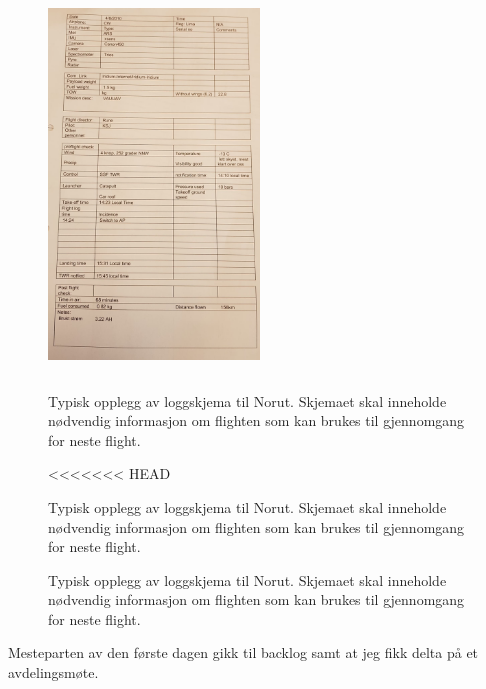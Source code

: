 \documentclass[12pt, a4paper]{article}
\begin{document}
\begin{figure}[ht]
	\centering
	\includegraphics[height= 10cm, width=0.5\textwidth]{bilder/flightlogNorut.png}

		\caption[Loggskjema]{Typisk opplegg av loggskjema til Norut. Skjemaet skal inneholde nødvendig informasjon om flighten som kan brukes til gjennomgang for neste flight. }

<<<<<<< HEAD
		\caption{Typisk opplegg av loggskjema til Norut. Skjemaet skal inneholde nødvendig informasjon om flighten som kan brukes til gjennomgang for neste flight.}

		\caption[Loggskjema]{Typisk opplegg av loggskjema til Norut. Skjemaet skal inneholde nødvendig informasjon om flighten som kan brukes til gjennomgang for neste flight. }

\end{figure}

\newpage
Mesteparten av den første dagen gikk til backlog samt at jeg fikk delta på et avdelingsmøte.\\
\end{document}
